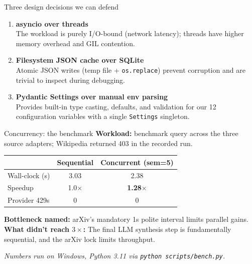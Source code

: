 \documentclass[aspectratio=169,11pt]{beamer}
\begin{document}
\begin{frame}{Three design decisions we can defend}
  \begin{enumerate}\setlength\itemsep{0.6em}
    \item \textbf{asyncio over threads}\\
      The workload is purely I/O-bound (network latency); threads have higher memory overhead and GIL contention.
    \item \textbf{Filesystem JSON cache over SQLite}\\
      Atomic JSON writes (temp file + \texttt{os.replace}) prevent corruption and are trivial to inspect during debugging.
    \item \textbf{Pydantic Settings over manual env parsing}\\
      Provides built-in type casting, defaults, and validation for our 12 configuration variables with a single \texttt{Settings} singleton.
  \end{enumerate}

  \vspace{0.6em}
\end{frame}

\begin{frame}{Concurrency: the benchmark}
  \textbf{Workload:} benchmark query across the three source adapters; Wikipedia returned 403 in the recorded run.

  \vspace{0.4em}
  \begin{center}\small
  \begin{tabular}{lcc}
    \toprule
    & \textbf{Sequential} & \textbf{Concurrent (sem=5)} \\
    \midrule
    Wall-clock (s) & 3.03 & 2.38 \\
    Speedup        & 1.0$\times$ & \textbf{1.28$\times$} \\
    Provider 429s  & 0  & 0 \\
    \bottomrule
  \end{tabular}
  \end{center}

  \vspace{0.4em}
  \textbf{Bottleneck named:} arXiv's mandatory 1s polite interval limits parallel gains.\\
  \textbf{What didn't reach $3\times$:} The final LLM synthesis step is fundamentally sequential, and the arXiv lock limits throughput.

  \vspace{0.3em}
  {\footnotesize\textit{Numbers run on Windows, Python 3.11 via \texttt{python scripts/bench.py}.}}
\end{frame}
\end{document}
